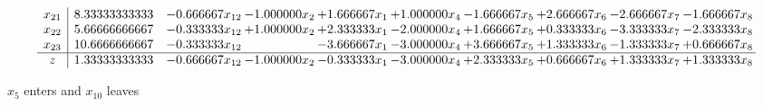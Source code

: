 \documentclass[10pt]{article}
\begin{document}
\[\begin{array}{c| c c@{\hskip 2pt} c@{\hskip 2pt} c@{\hskip 2pt} c@{\hskip 2pt} c@{\hskip 2pt} c@{\hskip 2pt} c@{\hskip 2pt} c@{\hskip 2pt} }
 x_{21}   &  8.33333333333 & -0.666667 x_{12} & -1.000000 x_{2} & + 1.666667 x_{1} & + 1.000000 x_{4} & -1.666667 x_{5} & + 2.666667 x_{6} & -2.666667 x_{7} & -1.666667 x_{8}\\
 x_{22}   &  5.66666666667 & -0.333333 x_{12} & + 1.000000 x_{2} & + 2.333333 x_{1} & -2.000000 x_{4} & + 1.666667 x_{5} & + 0.333333 x_{6} & -3.333333 x_{7} & -2.333333 x_{8}\\
 x_{23}   &  10.6666666667 & -0.333333 x_{12} &   & -3.666667 x_{1} & -3.000000 x_{4} & + 3.666667 x_{5} & + 1.333333 x_{6} & -1.333333 x_{7} & + 0.666667 x_{8}\\
\hline
z    &  1.33333333333 & -0.666667 x_{12} & -1.000000 x_{2} & -0.333333 x_{1} & -3.000000 x_{4} & + 2.333333 x_{5} & + 0.666667 x_{6} & + 1.333333 x_{7} & + 1.333333 x_{8}\\
\end{array}\]


 $ x_{5} $ enters and $ x_{10} $ leaves 
\end{document}
